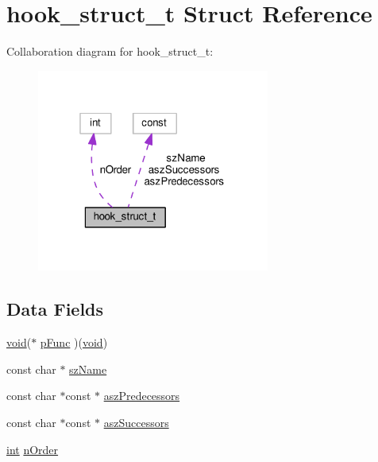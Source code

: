 \hypertarget{structhook__struct__t}{}\section{hook\+\_\+struct\+\_\+t Struct Reference}
\label{structhook__struct__t}


Collaboration diagram for hook\+\_\+struct\+\_\+t\+:
\nopagebreak
\begin{figure}[H]
\begin{center}
\leavevmode
\includegraphics[width=217pt]{structhook__struct__t__coll__graph}
\end{center}
\end{figure}
\subsection*{Data Fields}
\begin{DoxyCompactItemize}
\item 
\hyperlink{group__MOD__ISAPI_gacd6cdbf73df3d9eed42fa493d9b621a6}{void}($\ast$ \hyperlink{structhook__struct__t_a481c73af70470dcb807b123826da3583}{p\+Func} )(\hyperlink{group__MOD__ISAPI_gacd6cdbf73df3d9eed42fa493d9b621a6}{void})
\item 
const char $\ast$ \hyperlink{structhook__struct__t_a6bfaf69c37168581e15be4f6ee323ca3}{sz\+Name}
\item 
const char $\ast$const $\ast$ \hyperlink{structhook__struct__t_adadd450889bc29810601c0859978e0ba}{asz\+Predecessors}
\item 
const char $\ast$const $\ast$ \hyperlink{structhook__struct__t_a104cb733e8b185b8513f43a4d76919c3}{asz\+Successors}
\item 
\hyperlink{pcre_8txt_a42dfa4ff673c82d8efe7144098fbc198}{int} \hyperlink{structhook__struct__t_a2988ee834682354dcf837aa7de362e93}{n\+Order}
\end{DoxyCompactItemize}


